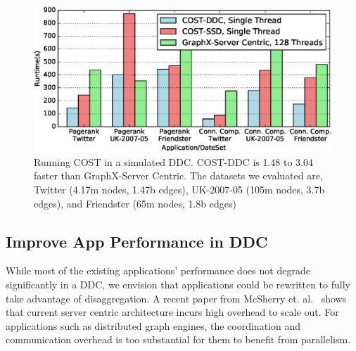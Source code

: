 \begin{figure}
  \centering
    \includegraphics[width = \columnwidth]{img/benefit.eps} 
  \caption{\small{Running COST in a simulated DDC. COST-DDC is 1.48 to 3.04 faster than GraphX-Server Centric. The datasets we evaluated are, Twitter (4.17m nodes, 1.47b edges), UK-2007-05 (105m nodes, 3.7b edges), and Friendster (65m nodes, 1.8b edges)}}
  \label{fig:benefit}
\end{figure}


\subsection{Improve App Performance in DDC}
While most of the existing applications' performance does not degrade significantly in a DDC, we envision that applications could be rewritten to fully take advantage of disaggregation. 
A recent paper from McSherry et. al.~\cite{cost} shows that current server centric architecture incurs high overhead to scale out.
For applications such as distributed graph engines, the coordination and communication overhead is too substantial for them to benefit from parallelism.

